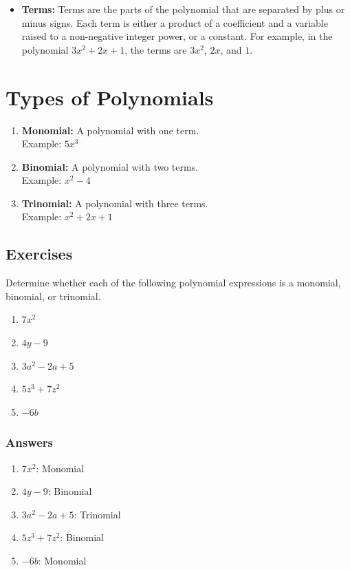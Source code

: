 \documentclass[12pt]{article}
\begin{document}
\begin{itemize}
\item \textbf{Terms:} Terms are the parts of the polynomial that are separated by plus or minus signs. Each term is either a product of a coefficient and a variable raised to a non-negative integer power, or a constant. For example, in the polynomial \(3x^2 + 2x + 1\), the terms are \(3x^2\), \(2x\), and \(1\).
\end{itemize}

\section*{Types of Polynomials}
\begin{enumerate}
\item \textbf{Monomial:} A polynomial with one term.\\Example: \(5x^3\)
\item \textbf{Binomial:} A polynomial with two terms.\\Example: \(x^2 - 4\)
\item \textbf{Trinomial:} A polynomial with three terms.\\Example: \(x^2 + 2x + 1\)
\end{enumerate}

\subsection*{Exercises}

Determine whether each of the following polynomial expressions is a monomial, binomial, or trinomial.

\begin{enumerate}
    \item $7x^2$
    \item $4y - 9$
    \item $3a^2 - 2a + 5$
    \item $5z^3 + 7z^2$
    \item $-6b$
\end{enumerate}

\subsubsection*{Answers}

\begin{enumerate}
    \item $7x^2$: Monomial
    \item $4y - 9$: Binomial
    \item $3a^2 - 2a + 5$: Trinomial
    \item $5z^3 + 7z^2$: Binomial
    \item $-6b$: Monomial
\end{enumerate}
\end{document}
